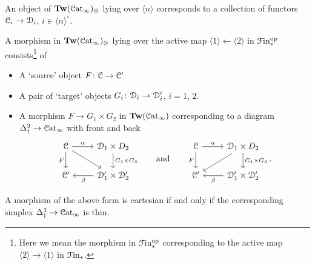 \documentclass[main.tex]{subfiles}
\begin{document}
\begin{example}
  An object of $\mathbf{Tw}(\mathcal{C}\mathrm{at}_{\infty})_{\otimes}$ lying over $\langle n \rangle$ corresponds to a collection of functors $\mathcal{C}_{i} \to \mathcal{D}_{i}$, $i \in \langle n \rangle^{\circ}$.
\end{example}

\begin{example}
  A morphism in $\mathbf{Tw}(\mathcal{C}\mathrm{at}_{\infty})_{\otimes}$ lying over the active map $\langle 1 \rangle \leftarrow \langle 2 \rangle$ in $\mathcal{F}\mathrm{in}_{*}^{\mathrm{op}}$ consists\footnote{Here we mean the morphism in $\mathcal{F}\mathrm{in}_{*}^{\mathrm{op}}$ corresponding to the active map $\langle 2 \rangle \to \langle 1 \rangle$ in $\mathcal{F}\mathrm{in}_{*}$.} of
  \begin{itemize}
    \item A `source' object $F\colon \mathcal{C} \to \mathcal{C}'$

    \item A pair of `target' objects $G_{i}\colon \mathcal{D}_{i} \to \mathcal{D}'_{i}$, $i = 1$, $2$.

    \item A morphism $F \to G_{1} \times G_{2}$ in $\mathbf{Tw}(\mathcal{C}\mathrm{at}_{\infty})$ corresponding to a diagram $\Delta^{3}_{\dagger} \to \mathcal{C}\mathrm{at}_{\infty}$ with front and back
      \begin{equation*}
        \begin{tikzcd}
          \category{C}
          \arrow[r, "\alpha"]
          \arrow[d, ""{name=L, right}, "F"{left}]
          \arrow[dr]
          & \category{D}_{1} \times D_{2}
          \arrow[d, ""{name=R, left}, "G_{1} \times G_{2}"{right}]
          \\
          \category{C}'
          & \category{D}'_{1} \times \category{D}'_{2}
          \arrow[l, "\beta"]
        \end{tikzcd}
        \qquad\text{and}\qquad
        \begin{tikzcd}
          \category{C}
          \arrow[r, "\alpha"]
          \arrow[d, ""{name=L, right}, "F"{left}]
          & \category{D}_{1} \times D_{2}
          \arrow[d, ""{name=R, left}, "G_{1} \times G_{2}"{right}]
          \arrow[dl]
          \\
          \category{C}'
          & \category{D}'_{1} \times \category{D}'_{2}
          \arrow[l, "\beta"]
        \end{tikzcd}.
      \end{equation*}
  \end{itemize}

  A morphism of the above form is cartesian if and only if the corresponding simplex $\Delta^{3}_{\dagger} \to \mathcal{C}\mathrm{at}_{\infty}$ is thin.
\end{example}
\end{document}

